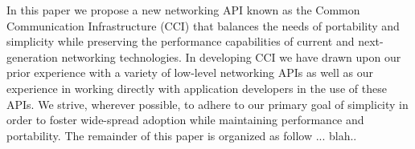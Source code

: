  
In this paper we propose a new networking API known as the Common
Communication Infrastructure (CCI) that balances the needs of
portability and simplicity while preserving the performance
capabilities of current and next-generation networking
technologies. In developing CCI we have drawn upon our prior
experience with a variety of low-level networking APIs as well as our
experience in working directly with application developers in the use
of these APIs. We strive, wherever possible, to adhere to our primary
goal of simplicity in order to foster wide-spread adoption while
maintaining performance and portability. The remainder of this paper
is organized as follow ... blah.. 


